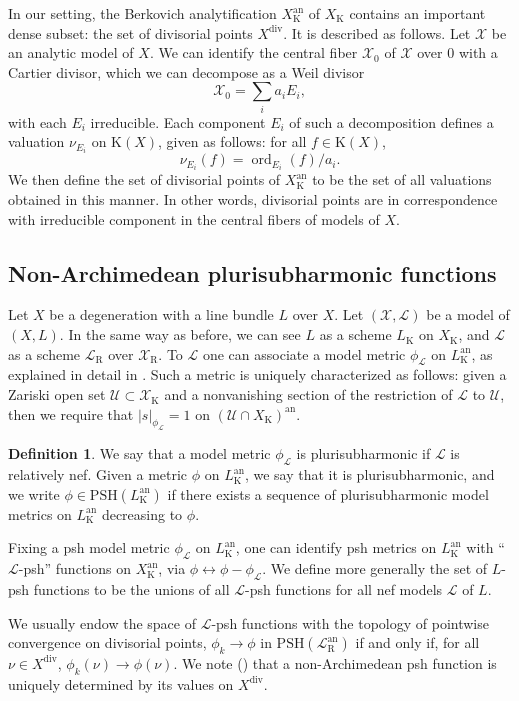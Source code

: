 \documentclass[JEP,XML,SOM,Unicode,NoEqCountersInSection,published]{cedram}
\theoremstyle{definition}
\newtheorem{defi}[theorem]{Definition}
\newcommand\cL{\mathcal{L}}
\newcommand\cX{\mathcal{X}}
\newcommand\K{\mathrm{K}}
\newcommand\R{\mathrm{R}}
\newcommand\an{^{\mathrm{an}}}
\DeclareMathOperator{\ord}{ord}
\newcommand\PSH{\mathrm{PSH}}
\begin{document}
In our setting, the Berkovich analytification $X_\K\an$ of $X_\K$ contains an important dense subset: the set of divisorial points $X^{\mathrm{div}}$. It is described as follows. Let $\cX$ be an analytic model of $X$. We can identify the central fiber $\cX_0$ of $\cX$ over $0$ with a Cartier divisor, which we can decompose as a Weil divisor
\[
\cX_0=\sum_i a_i E_i,
\]
with each $E_i$ irreducible. Each component $E_i$ of such a decomposition defines a valuation $\nu_{E_i}$ on $\K(X)$, given as follows: for all $f\in \K(X)$,
\[
\nu_{E_i}(f)=\ord_{E_i}(f)/a_i.
\]
We then define the set of divisorial points of $X_\K\an$ to be the set of all valuations obtained in this manner. In other words, divisorial points are in correspondence with irreducible component in the central fibers of models of $X$.

\subsection{Non-Archimedean plurisubharmonic functions}\label{sect_nappt}

Let $X$ be a degeneration with a line bundle $L$ over $X$. Let $(\cX,\cL)$ be a model of $(X,L)$. In the same way as before, we can see $L$ as a scheme $L_\K$ on $X_\K$, and $\cL$ as a scheme $\cL_\R$ over $\cX_\R$. To $\cL$ one can associate a model metric $\phi_\cL$ on $L_\K\an$, as explained in detail in \cite{bfjsemi}. Such a metric is uniquely characterized as follows: given a Zariski open set $\mathcal{U}\subset\cX_\K$ and a nonvanishing section of the restriction of $\cL$ to $\mathcal{U}$, then we require that $|s|_{\phi_\cL}=1$ on $(\mathcal{U}\cap X_\K)\an$.

\begin{defi}\label{def_defpsh}We say that a model metric $\phi_\cL$ is plurisubharmonic if $\cL$ is relatively nef. Given a metric $\phi$ on $L_\K\an$, we say that it is plurisubharmonic, and we write $\phi\in\PSH(L_\K\an)$ if there exists a sequence of plurisubharmonic model metrics on $L_\K\an$ decreasing to $\phi$.
\end{defi}

Fixing a psh model metric $\phi_\cL$ on $L_\K\an$, one can identify psh metrics on $L_\K\an$ with ``$\cL$-psh'' functions on $X_\K\an$, via $\phi \leftrightarrow \phi-\phi_\cL$. We define more generally the set of $L$-psh functions to be the unions of all $\cL$-psh functions for all nef models $\cL$ of $L$.

We usually endow the space of $\cL$-psh functions with the topology of pointwise convergence on divisorial points, \ie $\phi_k\to\phi$ in $\PSH(\cL_\R\an)$ if and only if, for all $\nu\in X^{\mathrm{div}}$, $\phi_k(\nu)\to\phi(\nu)$. We note (\cite{bfjsemi}) that a non-Archimedean psh function is uniquely determined by its values on $X^{\mathrm{div}}$.
\end{document}
